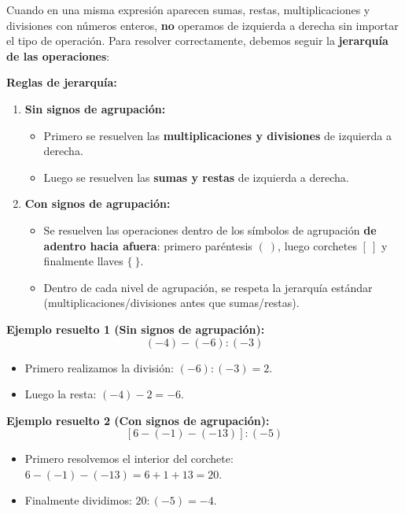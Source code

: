 \documentclass[12pt, letterpaper]{article}
\begin{document}
Cuando en una misma expresión aparecen sumas, restas, multiplicaciones y divisiones con números enteros, \textbf{no} operamos de izquierda a derecha sin importar el tipo de operación. Para resolver correctamente, debemos seguir la \textbf{jerarquía de las operaciones}:

\begin{cuadroteoria}
  \textbf{Reglas de jerarquía:}
  \begin{enumerate}
    \item \textbf{Sin signos de agrupación:}
          \begin{itemize}
            \item Primero se resuelven las \textbf{multiplicaciones y divisiones} de izquierda a derecha.
            \item Luego se resuelven las \textbf{sumas y restas} de izquierda a derecha.
          \end{itemize}
    \item \textbf{Con signos de agrupación:}
          \begin{itemize}
            \item Se resuelven las operaciones dentro de los símbolos de agrupación \textbf{de adentro hacia afuera}: primero paréntesis $(\ )$, luego corchetes $[\ ]$ y finalmente llaves $\{\ \}$.
            \item Dentro de cada nivel de agrupación, se respeta la jerarquía estándar (multiplicaciones/divisiones antes que sumas/restas).
          \end{itemize}
  \end{enumerate}
\end{cuadroteoria}

\noindent\textbf{Ejemplo resuelto 1 (Sin signos de agrupación):}
\[
  (-4) - (-6) : (-3)
\]
\begin{itemize}
  \item Primero realizamos la división: $(-6) : (-3) = 2$.
  \item Luego la resta: $(-4) - 2 = -6$.
\end{itemize}

\noindent\textbf{Ejemplo resuelto 2 (Con signos de agrupación):}
\[
  [6 - (-1) - (-13)] : (-5)
\]
\begin{itemize}
  \item Primero resolvemos el interior del corchete: $6 - (-1) - (-13) = 6 + 1 + 13 = 20$.
  \item Finalmente dividimos: $20 : (-5) = -4$.
\end{itemize}
\end{document}
